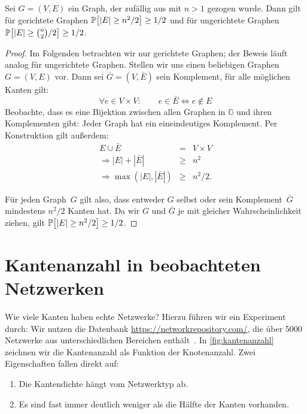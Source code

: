 \begin{observation}
    Sei $G = (V,E)$ ein Graph, der zufällig aus \Gn mit $n > 1$ gezogen wurde.
    Dann gilt für gerichtete Graphen $\mathbb{P}\!\left[|E| \ge n^2 / 2\right] \ge 1/2$ und für ungerichtete Graphen $\mathbb{P}\!\left[|E| \ge \binom{n}{2} / 2\right] \ge 1/2$.
\end{observation}

\begin{proof}
    Im Folgenden betrachten wir nur gerichtete Graphen; der Beweis läuft analog für ungerichtete Graphen.
    Stellen wir uns einen beliebigen Graphen~$G = (V, E)$ vor.
    Dann sei $\bar G = (V, \bar E)$ sein Komplement, \dh für alle möglichen Kanten gilt:
    \begin{equation}
        \forall e \in V\times V\colon \quad\quad e \in \bar E \Leftrightarrow e \notin E
    \end{equation}
    Beobachte, dass es eine Bijektion zwischen allen Graphen in $\mathbb G$ und ihren Komplementen gibt: Jeder Graph hat ein eineindeutiges Komplement.
    Per Konstruktion gilt außerdem:
    \begin{eqnarray}
        E \cup \bar E &=& V \times V\\
        \Rightarrow |E| + |\bar E| &\ge& n^2\\
        \Rightarrow \max(|E|, |\bar E|) &\ge& n^2 / 2.
    \end{eqnarray}

    Für jeden Graph~$G$ gilt also, dass entweder $G$ selbst oder sein Komplement~$\bar G$ mindestens $n^2 / 2$ Kanten hat.
    Da wir $G$ und $\bar G$ je mit gleicher Wahrscheinlichkeit ziehen, gilt $\mathbb{P}\!\left[|E| \ge n^2 / 2\right] \ge 1/2$.
\end{proof}

\section{Kantenanzahl in beobachteten Netzwerken}\label{sec:kanten-in-beobachteten-netzen}
Wie viele Kanten haben echte Netzwerke? Hierzu führen wir ein Experiment durch:
Wir nutzen die Datenbank \url{https://networkrepository.com/}, die über 5000 Netzwerke aus unterschiedlichen Bereichen enthält~\cite{networkrepository}.
In \cref{fig:kantenanzahl} zeichnen wir die Kantenanzahl als Funktion der Knotenanzahl.
Zwei Eigenschaften fallen direkt auf:
\begin{enumerate}
    \item Die Kantendichte hängt vom Netzwerktyp ab.
    \item Es sind fast immer deutlich weniger als die Hälfte der Kanten vorhanden.
\end{enumerate}


